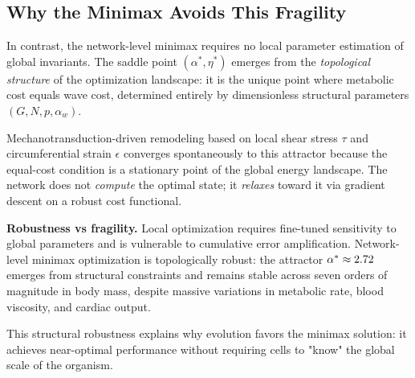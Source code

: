 \subsection{Why the Minimax Avoids This Fragility}

In contrast, the network-level minimax requires no local parameter estimation of
global invariants. The saddle point $(\alpha^*, \eta^*)$ emerges from the
\emph{topological structure} of the optimization landscape: it is the unique
point where metabolic cost equals wave cost, determined entirely by
dimensionless structural parameters $(G, N, p, \alpha_w)$.

Mechanotransduction-driven remodeling based on local shear stress $\tau$ and
circumferential strain $\epsilon$ converges spontaneously to this attractor
because the equal-cost condition is a stationary point of the global energy
landscape. The network does not \emph{compute} the optimal state; it
\emph{relaxes} toward it via gradient descent on a robust cost functional.

\textbf{Robustness vs fragility.} Local optimization requires fine-tuned
sensitivity to global parameters and is vulnerable to cumulative error
amplification. Network-level minimax optimization is topologically robust: the
attractor $\alpha^* \approx 2.72$ emerges from structural constraints
and remains stable across seven orders of magnitude in body mass, despite
massive variations in metabolic rate, blood viscosity, and cardiac output.

This structural robustness explains why evolution favors the minimax solution:
it achieves near-optimal performance without requiring cells to "know" the
global scale of the organism.

